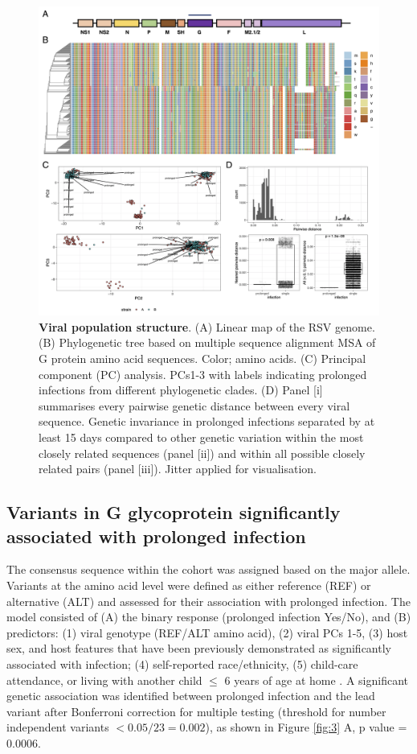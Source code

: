 \documentclass{article} %
\begin{document}
\begin{figure}[ht] \hspace{-0.5cm} 
    \includegraphics[scale=0.8]{f2}
	\caption{\textbf{Viral population structure}.
 (A) Linear map of the RSV genome. (B) Phylogenetic tree based on multiple sequence alignment MSA of G protein amino acid sequences. Color; amino acids. (C) Principal component (PC) analysis. PCs1-3 with labels indicating prolonged infections from different phylogenetic clades. (D) Panel [i] summarises every pairwise genetic distance between every viral sequence. Genetic invariance in prolonged infections separated by at least 15 days compared to other genetic variation within the most closely related sequences (panel [ii]) and within all possible closely related pairs (panel [iii]). Jitter applied for visualisation.}
	\label{fig:2} 
\end{figure}
\clearpage

\subsection{Variants in G glycoprotein significantly associated with prolonged infection}
The consensus sequence within the cohort was assigned based on the major allele. 
Variants at the amino acid level were defined as either reference (REF) or alternative (ALT) and assessed for their association with prolonged infection. 
The model consisted of (A) the binary response (prolonged infection Yes/No), and (B) predictors: (1) viral genotype (REF/ALT amino acid), (2) viral PCs 1-5, (3) host sex, and host features that have been previously demonstrated as significantly associated with infection; (4) self-reported race/ethnicity, (5) child-care attendance, or living with another child $\le$ 6 years of age at home 
\citep{hall1976respiratory}. 
A significant genetic association was identified  between prolonged infection and the lead variant after Bonferroni correction for multiple testing (threshold for number independent variants $< 0.05/23 = 0.002$), as shown in Figure \ref{fig:3} A, p value = 0.0006.
\end{document}

